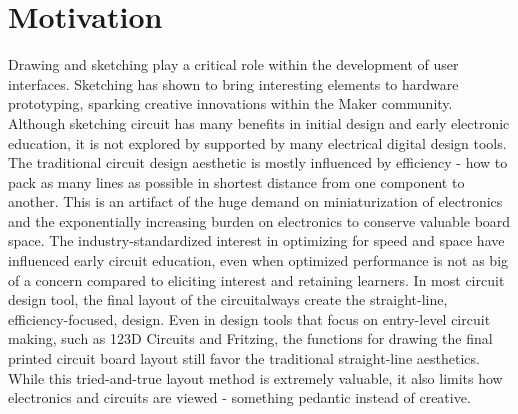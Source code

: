 \documentclass{sigchi}
\begin{document}
\section{Motivation}
Drawing and sketching play a critical role within the development of user interfaces. Sketching has shown to bring interesting elements to hardware prototyping, sparking creative innovations within the Maker community. Although sketching circuit has many benefits in initial design and early electronic education, it is not explored by supported by many electrical digital design tools. 
The traditional circuit design aesthetic is mostly influenced by efficiency - how to pack as many lines as possible in shortest distance from one component to another. This is an artifact of the huge demand on miniaturization of electronics and the exponentially increasing burden on electronics to conserve valuable board space. The industry-standardized interest in optimizing for speed and space have influenced early circuit education, even when optimized performance is not as big of a concern compared to eliciting interest and retaining learners. In most circuit design tool, the final layout of the circuitalways create the straight-line, efficiency-focused, design. Even in design tools that focus on entry-level circuit making, such as 123D Circuits and Fritzing, the functions for drawing the final printed circuit board layout still favor the traditional straight-line aesthetics. While this tried-and-true layout method is extremely valuable, it also limits how electronics and circuits are viewed - something pedantic instead of creative. 
\end{document}
